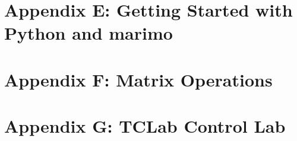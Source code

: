 \documentclass[
  american,
]{report}
\begin{document}
\section{Appendix E: Getting Started with Python and
marimo}\label{appendix-e-getting-started-with-python-and-marimo}

\section{Appendix F: Matrix
Operations}\label{appendix-f-matrix-operations}

\section{Appendix G: TCLab Control
Lab}\label{appendix-g-tclab-control-lab}
\end{document}
